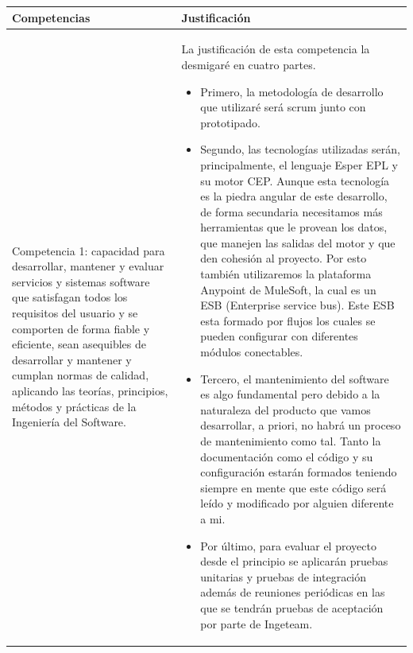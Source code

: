\documentclass[a4paper]{article}
\begin{document}
\bigskip
\begin{longtable}{m{5.605cm}m{10.849cm}}

    \rowcolor{gray!50}
	{\color{black} \textbf{Competencias}} &
	{\color{black} \textbf{Justificaci\'on}}\\\hline
    
    {\color{black} Competencia 1: capacidad para desarrollar, mantener y evaluar servicios y sistemas software que satisfagan todos los requisitos del usuario y se comporten de forma fiable y eficiente, sean asequibles de desarrollar y mantener y cumplan normas de calidad, aplicando las teor\'ias, principios, m\'etodos y pr\'acticas de la Ingenier\'ia del Software.} &
    {\color{black} La justificación de esta competencia la desmigaré en cuatro partes.
    {\begin{itemize} 
    \item Primero, la metodología de desarrollo que utilizaré será scrum junto con prototipado.
    \item Segundo, las tecnologías utilizadas serán, principalmente, el lenguaje Esper EPL y su motor CEP. Aunque esta tecnología es la piedra angular de este desarrollo, de forma secundaria necesitamos más herramientas que le provean los datos, que manejen las salidas del motor y que den cohesión al proyecto. Por esto también utilizaremos la plataforma Anypoint de MuleSoft, la cual es un ESB (Enterprise service bus). Este ESB esta formado por flujos los cuales se pueden configurar con diferentes módulos conectables.
    \item Tercero, el mantenimiento del software es algo fundamental pero debido a la naturaleza del producto que vamos desarrollar, a priori, no habrá un proceso de mantenimiento como tal. Tanto la documentación como el código y su configuración estarán formados teniendo siempre en mente que este código será leído y modificado por alguien diferente a mi.
    \item Por último, para evaluar el proyecto desde el principio se aplicarán pruebas unitarias y pruebas de integración además de reuniones periódicas en las que se tendrán pruebas de aceptación por parte de Ingeteam.
    \end{itemize}}
    }\\
    

\end{longtable}
\end{document}
